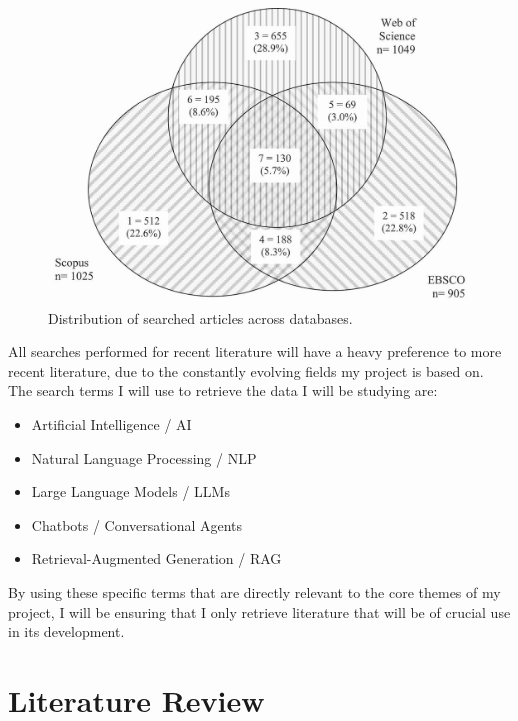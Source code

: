 \documentclass[12pt]{report}
\begin{document}
    \begin{figure}[H]
        \centering
        \includegraphics[width=.6\linewidth]{litSearchDBs.jpg}
        \caption{Distribution of searched articles across databases. \autocite{litSearch}}
        \label{fig:litSearch}
    \end{figure}
   
    \noindent 
    All searches performed for recent literature will have a heavy preference 
    to more recent literature, due to the constantly evolving fields my project is based on. 
    The search terms I will use to retrieve the data I will be studying are:

    \begin{itemize}
        \item Artificial Intelligence / AI 
        \item Natural Language Processing / NLP
        \item Large Language Models / LLMs
        \item Chatbots / Conversational Agents
        \item Retrieval-Augmented Generation / RAG
        
        
    \end{itemize}

    \noindent
    By using these specific terms that are directly relevant to the core themes of my project,
    I will be ensuring that I only retrieve literature that will be of crucial use in its 
    development.


    \chapter{Literature Review}
\end{document}

